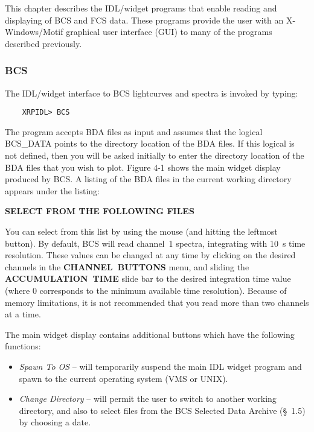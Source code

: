 {{{This chapter describes the IDL/widget programs that
enable reading and displaying of BCS and FCS data. These programs
provide the user with an \hbox{X-Windows/Motif} graphical user interface (GUI) to
many of the programs described previously.

\subsubsection{BCS}

The IDL/widget interface to BCS lightcurves and spectra is
invoked by typing:
\begin{verbatim}
    XRPIDL> BCS
\end{verbatim}
\noindent The program accepts BDA files as input and assumes that the logical
BCS\_DATA points to the directory  location of the BDA files. If this logical
is not defined, then you will be asked initially to  enter the directory
location of the BDA files that you wish to plot. Figure 4-1
shows
the main widget display produced by BCS. A listing of the BDA files in the
current  working directory appears under the listing:
\newline
\newline
\centerline{\bf SELECT FROM THE FOLLOWING FILES}
\newline
\newline
\noindent You can select from this list by using the
mouse (and hitting the leftmost button). By default, BCS will read channel~1
spectra, integrating  with 10~s time resolution. These values  can be changed
at any time by clicking on the desired channels in the
\hbox{\bf CHANNEL BUTTONS}
menu, and sliding the \hbox{\bf ACCUMULATION TIME} slide bar to the desired
integration time value (where 0 corresponds to the minimum available time
resolution).  Because of memory limitations, it is not recommended that you
read more than two channels at a time.

The main widget display contains additional buttons which have the following
functions:
\begin{itemize}

\item{\it Spawn To OS} -- will temporarily suspend the main IDL widget
program and spawn to the current operating system (VMS or UNIX).

\item{\it Change Directory} -- will permit the user to switch
to another working directory, and also to select files from the BCS
Selected Data Archive (\S~1.5) by choosing a date.


\end{itemize}}}}
